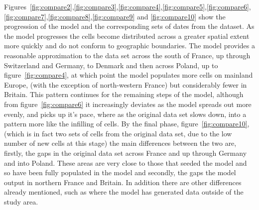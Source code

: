 Figures~\ref{fig:compare2},\ref{fig:compare3},\ref{fig:compare4},\ref{fig:compare5},\ref{fig:compare6},\ref{fig:compare7},\ref{fig:compare8},\ref{fig:compare9} and \ref{fig:compare10} show the progression of the model and the corresponding sets of dates from the dataset. As the model progresses the cells become distributed across a greater spatial extent more quickly and do not conform to geographic boundaries. The model provides a reasonable approximation to the data set across the south of France, up through Switzerland and Germany, to Denmark and then across Poland, up to figure~\ref{fig:compare4}, at which point the model populates more cells on mainland Europe, (with the exception of north-western France) but considerably fewer in Britain. This pattern continues for the remaining steps of the model, although from figure~\ref{fig:compare6} it increasingly deviates as the model spreads out more evenly, and picks up it's pace, where as the original data set slows down, into a pattern more like the infilling of cells. By the final phase,  figure~\ref{fig:compare10}, (which is in fact two sets of cells from the original data set, due to the low number of new cells at this stage) the main differences between the two are, firstly, the gaps in the original data set across France and up through Germany and into Poland. These areas are very close to those that seeded the model and so have been fully populated in the model and secondly, the gaps the model output in northern France and Britain. In addition there are other differences already mentioned, such as where the model has generated data outside of the study area.

